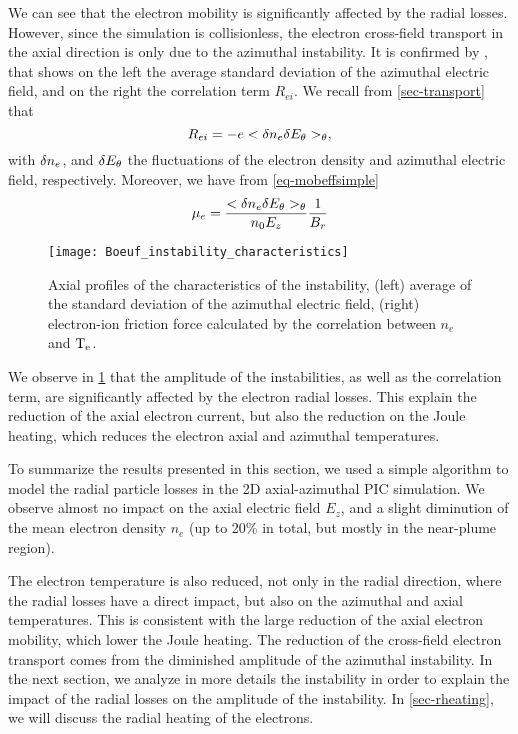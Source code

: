     We can see that the electron mobility is significantly affected by the radial losses.
    However, since the simulation is collisionless, the electron cross-field transport in the axial direction is only due to the azimuthal instability.
    It is confirmed by , that shows on the left the average standard deviation of the azimuthal electric field, and on the right the correlation term $R_{ei}$.
    We recall from \cref{sec-transport} that 
    \begin{equation} \label{eq-rei}
      R_{ei} =  - e < \delta n_e \delta E_{\theta} >_{\theta},
    \end{equation}
    with $\delta n_e$, and $\delta E_{\theta}$ the fluctuations of the electron density and azimuthal electric field, respectively.
    Moreover, we have from \cref{eq-mobeffsimple}
    \begin{equation*}
      \mu_e = \frac{< \delta n_e \delta E_{\theta} >_{\theta} }{n_0 E_z}   \frac{1}{B_r}
    \end{equation*}


    \begin{figure}[!hbt]
      \centering
      \texttt{[image: Boeuf\_instability\_characteristics]}
      \caption{Axial profiles of the characteristics of the instability, (left) average of the standard deviation of the azimuthal electric field, (right) electron-ion friction force calculated by the correlation between $n_e$ and $\mathrm{T_e}$.    }
      \label{fig-boeuf-instability}
    \end{figure}

    
    We observe in \cref{fig-boeuf-instability} that the amplitude of the instabilities, as well as the correlation term, are significantly affected by the electron radial losses.
    This explain the reduction of the axial electron current, but also the reduction on the Joule heating, which reduces the electron axial and azimuthal temperatures.

    \vspace{1em}
    To summarize the results presented in this section, we used a simple algorithm to model the radial particle losses in the \ac{2D} axial-azimuthal \ac{PIC} simulation.
    We observe almost no impact on the axial electric field $E_z$, and a slight diminution of the mean electron density $n_e$ (up to 20\% in total, but mostly in the near-plume region).
    
    The electron temperature is also reduced, not only in the radial direction, where the radial losses have a direct impact, but also on the azimuthal and axial temperatures.
    This is consistent with the large reduction of the axial electron mobility, which lower the Joule heating.
    The reduction of the cross-field electron transport comes from the diminished amplitude of the azimuthal instability.
    In the next section, we analyze in more details the instability in order to explain the impact of the radial losses on the amplitude of the instability.
    In \cref{sec-rheating}, we will discuss the radial heating of the electrons.


\afterpage{\clearpage}

